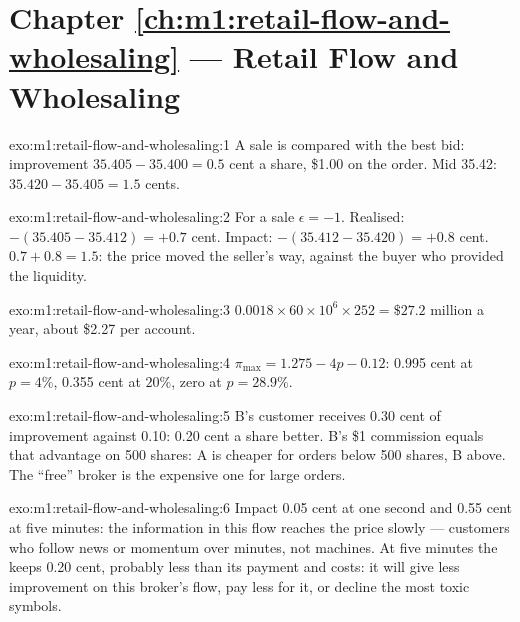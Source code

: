 \section*{Chapter \ref{ch:m1:retail-flow-and-wholesaling} --- Retail Flow and Wholesaling}

\begin{solution}{exo:m1:retail-flow-and-wholesaling:1}
A sale is compared with the best bid: improvement $35.405 - 35.400 = 0.5$
cent a share, \$1.00 on the order. Mid 35.42: 
$35.420 - 35.405 = 1.5$ cents.
\end{solution}

\begin{solution}{exo:m1:retail-flow-and-wholesaling:2}
For a sale $\epsilon = -1$. Realised: $-(35.405 - 35.412) = +0.7$ cent.
Impact: $-(35.412 - 35.420) = +0.8$ cent. $0.7 + 0.8 = 1.5$: the price moved
the seller's way, against the buyer who provided the liquidity.
\end{solution}

\begin{solution}{exo:m1:retail-flow-and-wholesaling:3}
$0.0018 \times 60\times10^6 \times 252 = \$27.2$ million a year, about \$2.27
per account.
\end{solution}

\begin{solution}{exo:m1:retail-flow-and-wholesaling:4}
$\pi_{\max} = 1.275 - 4p - 0.12$: 0.995 cent at $p = 4\%$, 0.355 cent at
$20\%$, zero at $p = 28.9\%$.
\end{solution}

\begin{solution}{exo:m1:retail-flow-and-wholesaling:5}
B's customer receives 0.30 cent of improvement against 0.10: 0.20 cent a
share better. B's \$1 commission equals that advantage on 500 shares: A is
cheaper for orders below 500 shares, B above. The ``free'' broker is the
expensive one for large orders.
\end{solution}

\begin{solution}{exo:m1:retail-flow-and-wholesaling:6}
Impact 0.05 cent at one second and 0.55 cent at five minutes: the
information in this flow reaches the price slowly --- customers who follow
news or momentum over minutes, not machines. At five minutes the 
keeps 0.20 cent, probably less than its payment and costs: it will give less
improvement on this broker's flow, pay less for it, or decline the most toxic
symbols.
\end{solution}

